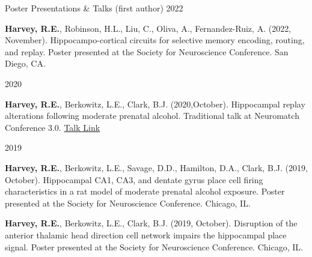 

\begin{cventries}
\cventry
    {Poster Presentations \& Talks (first author)} %
    {} %
    {} %
    {2022} %
    {
      \begin{cvitems} %
        \setlength\itemsep{0.35em}
        \item {\textbf{Harvey, R.E.}, Robinson, H.L., Liu, C., Oliva, A., Fernandez-Ruiz, A. (2022, November). Hippocampo-cortical circuits for selective memory encoding, routing, and replay. Poster presented at the Society for Neuroscience Conference. San Diego, CA.}
      \end{cvitems}
    }
\end{cventries}

\begin{cventries}
\cventry
    {} %
    {} %
    {} %
    {2020} %
    {
      \begin{cvitems} %
        \setlength\itemsep{0.35em}
        \item {\textbf{Harvey, R.E.}, Berkowitz, L.E., Clark, B.J. (2020,October). Hippocampal replay alterations following moderate prenatal alcohol. Traditional talk at Neuromatch Conference 3.0. \href{https://www.youtube.com/watch?v=YlsuJasxjjg&t=5s&ab_channel=NeuromatchConference}{Talk Link}}    
      \end{cvitems}
    }
\end{cventries}
    
\begin{cventries}
\cventry
    {} %
    {} %
    {} %
    {2019} %
    {
      \begin{cvitems} %
      \setlength\itemsep{0.35em}
        \item {\textbf{Harvey, R.E.}, Berkowitz, L.E., Savage, D.D., Hamilton, D.A., Clark, B.J. (2019, October). Hippocampal CA1, CA3, and dentate gyrus place cell firing characteristics in a rat model of moderate prenatal alcohol exposure. Poster presented at the Society for Neuroscience Conference. Chicago, IL.} 
        \item {\textbf{Harvey, R.E.}, Berkowitz, L.E., Clark, B.J. (2019, October). Disruption of the anterior thalamic head direction cell network impairs the hippocampal place signal. Poster presented at the Society for Neuroscience Conference. Chicago, IL.}
      \end{cvitems}
    }
\end{cventries}


